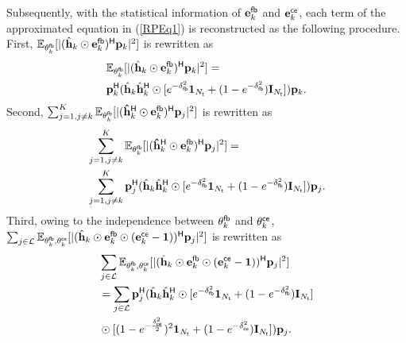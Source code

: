 \documentclass[draftclsnofoot, onecolumn, comsoc, 12pt]{IEEEtran}
\begin{document}
Subsequently, with the statistical information of ${\mathbf{e}_{k}^{\sf{fb}}}$ and ${\mathbf{e}_{k}^{\sf{ce}}}$, each term of the approximated equation in (\ref{RPEq1}) is reconstructed as the following procedure.
First, $\mathbb{E}_{\mathbf{\theta}_{k}^{\sf{fb}}}[\vert(\hat{\mathbf{h}}_{k} \odot {\mathbf{e}_{k}^{\sf{fb}}})^{\sf{H}} \mathbf{p}_{k} \vert^{2}]$ is rewritten as
\begin{align}
\label{Derv_6} 
& \mathbb{E}_{\mathbf{\theta}_{k}^{\sf{fb}}}[\vert(\hat{\mathbf{h}}_{k} \odot {\mathbf{e}_{k}^{\sf{fb}}})^{\sf{H}} \mathbf{p}_{k} \vert^{2}] = 
\nonumber \\
& \mathbf{p}_{k}^{\sf{H}}(\hat{\mathbf{h}}_{k}\hat{\mathbf{h}}_{k}^{\sf{H}}\odot [e^{-\delta_{\sf{fb}}^{2}}\mathbf{1}_{N_{{\sf{t}}}} + (1-e^{-\delta_{\sf{fb}}^{2}})\mathbf{I}_{N_{{\sf{t}}}}])\mathbf{p}_{k}.
\end{align}
Second, $\sum_{j=1, j \neq k}^{K} \mathbb{E}_{\mathbf{\theta}_{k}^{\sf{fb}}}[\vert (\mathbf{\hat{h}}_{k}^{\sf{H}}\odot{\mathbf{e}_{k}^{\sf{fb}}})^{\sf{H}} \mathbf{p}_{j} \vert^{2}]$ is rewritten as
\begin{align}
\label{Derv_7} 
& \sum_{j=1, j \neq k}^{K} \mathbb{E}_{\mathbf{\theta}_{k}^{\sf{fb}}}[\vert (\mathbf{\hat{h}}_{k}^{\sf{H}}\odot{\mathbf{e}_{k}^{\sf{fb}}})^{\sf{H}} \mathbf{p}_{j} \vert^{2}]  =
\nonumber \\
& \sum_{j=1, j \neq k}^{K} \mathbf{p}_{j}^{\sf{H}}(\hat{\mathbf{h}}_{k}\hat{\mathbf{h}}_{k}^{\sf{H}}\odot[e^{-\delta_{\sf{fb}}^{2}}\mathbf{1}_{N_{{\sf{t}}}} + (1-e^{-\delta_{\sf{fb}}^{2}})\mathbf{I}_{N_{{\sf{t}}}} ])\mathbf{p}_{j}.
\end{align}
Third, owing to the independence between $\mathbf{\theta}_{k}^{\sf{fb}}$ and $\mathbf{\theta}_{k}^{\sf{ce}}$, $\sum_{j\in \mathcal{L}} \mathbb{E}_{\mathbf{\theta}_{k}^{\sf{fb}}, \mathbf{\theta}_{k}^{\sf{ce}}}[\vert(\hat{\mathbf{h}}_{k} \odot {\mathbf{e}_{k}^{\sf{fb}}} \odot 
({\mathbf{e}_{k}^{\sf{ce}}} - \mathbf{1}))^{\sf{H}} \mathbf{p}_{j}\vert^{2}]$ is rewritten as
\begin{align}
\label{Derv_8} 
& \sum_{j\in \mathcal{L}} \mathbb{E}_{\mathbf{\theta}_{k}^{\sf{fb}}, \mathbf{\theta}_{k}^{\sf{ce}}}[\vert(\hat{\mathbf{h}}_{k} \odot {\mathbf{e}_{k}^{\sf{fb}}} \odot 
({\mathbf{e}_{k}^{\sf{ce}}} - \mathbf{1}))^{\sf{H}} \mathbf{p}_{j}\vert^{2}] 
\nonumber \\
& =\sum_{j\in \mathcal{L}} \mathbf{p}_{j}^{\sf{H}}(\hat{\mathbf{h}}_{k}\hat{\mathbf{h}}_{k}^{\sf{H}} 
\odot[e^{-\delta_{\sf{fb}}^{2}}\mathbf{1}_{N_{{\sf{t}}}} + (1-e^{-\delta_{\sf{fb}}^{2}})\mathbf{I}_{N_{{\sf{t}}}}] 
\nonumber \\
& \odot[(1-e^{-\frac{\delta_{\sf{ce}}^{2}}{2}})^{2}\mathbf{1}_{N_{{\sf{t}}}} + (1-e^{-\delta_{\sf{ce}}^{2}})\mathbf{I}_{N_{{\sf{t}}}}])\mathbf{p}_{j}.
\end{align}
\end{document}
